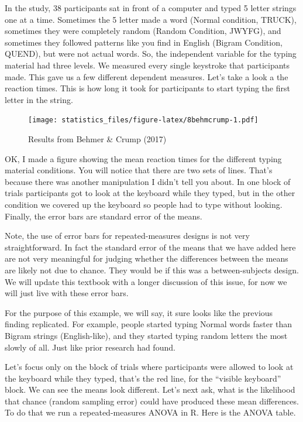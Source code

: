 \documentclass[]{book}
\newenvironment{marginnote}%
  {\itshape}%
  {}
\begin{document}
In the study, 38 participants sat in front of a computer and typed 5 letter strings one at a time. Sometimes the 5 letter made a word (Normal condition, TRUCK), sometimes they were completely random (Random Condition, JWYFG), and sometimes they followed patterns like you find in English (Bigram Condition, QUEND), but were not actual words. So, the independent variable for the typing material had three levels. We measured every single keystroke that participants made. This gave us a few different dependent measures. Let's take a look a the reaction times. This is how long it took for participants to start typing the first letter in the string.

\begin{figure}
\centering
\texttt{[image: statistics\_files/figure-latex/8behmcrump-1.pdf]}
\caption{\label{fig:8behmcrump}Results from Behmer \& Crump (2017)}
\end{figure}

OK, I made a figure showing the mean reaction times for the different typing material conditions. You will notice that there are two sets of lines. That's because there was another manipulation I didn't tell you about. In one block of trials participants got to look at the keyboard while they typed, but in the other condition we covered up the keyboard so people had to type without looking. Finally, the error bars are standard error of the means.

\begin{marginnote}

Note, the use of error bars for repeated-measures designs is not very straightforward. In fact the standard error of the means that we have added here are not very meaningful for judging whether the differences between the means are likely not due to chance. They would be if this was a between-subjects design. We will update this textbook with a longer discussion of this issue, for now we will just live with these error bars.

\end{marginnote}

For the purpose of this example, we will say, it sure looks like the previous finding replicated. For example, people started typing Normal words faster than Bigram strings (English-like), and they started typing random letters the most slowly of all. Just like prior research had found.

Let's focus only on the block of trials where participants were allowed to look at the keyboard while they typed, that's the red line, for the ``visible keyboard'' block. We can see the means look different. Let's next ask, what is the likelihood that chance (random sampling error) could have produced these mean differences. To do that we run a repeated-measures ANOVA in R. Here is the ANOVA table.
\end{document}
